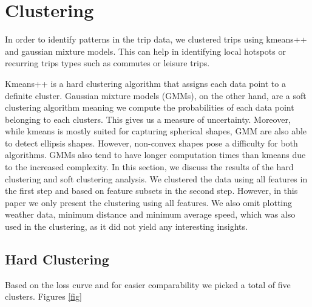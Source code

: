 \section{Clustering}
\label{sec:clustering}

In order to identify patterns in the trip data, we clustered trips using kmeans++ and gaussian mixture models. This can help in identifying local hotspots or recurring trips types such as commutes or leisure trips. 

Kmeans++ is a hard clustering algorithm that assigns each data point to a definite cluster. Gaussian mixture models (GMMs), on the other  hand, are a soft clustering algorithm meaning we compute the probabilities of each data point belonging to each clusters. This gives us a measure of uncertainty. Moreover, while kmeans is mostly suited for capturing spherical shapes, GMM are also able to detect ellipsis shapes. However, non-convex shapes pose a difficulty for both algorithms. GMMs also tend to have longer computation times than kmeans due to the increased complexity. 
In this section, we discuss the results of the hard clustering and soft clustering analysis. We clustered the data using all features in the first step and based on feature subsets in the second step. However, in this paper we only present the clustering using all features. We also omit plotting weather data, minimum distance and minimum average speed, which was also used in the clustering, as it did not yield any interesting insights. 

\subsection{Hard Clustering}
\label{sec:hard_clustering}

Based on the loss curve and for easier comparability we picked a total of five clusters. Figures \ref{fig}


